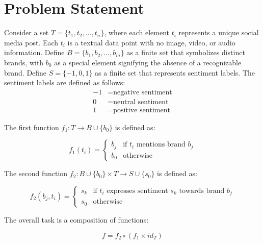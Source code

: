 \documentclass{article}
\begin{document}
\section{Problem Statement}

Consider a set $T = \{t_1, t_2, \ldots, t_n\}$, where each element $t_i$
represents a unique social media post. Each $t_i$ is a textual data point with
no image, video, or audio information. Define $B = \{b_1, b_2, \ldots, b_m\}$
as a finite set that symbolizes distinct brands, with $b_0$ as a special
element signifying the absence of a recognizable brand. Define $S = \{-1, 0,
    1\}$ as a finite set that represents sentiment labels. The sentiment labels are
defined as follows:
\begin{align*}
    -1 & = \text{negative sentiment} \\
    0  & = \text{neutral sentiment}  \\
    1  & = \text{positive sentiment}
\end{align*}

The first function $f_1: T \rightarrow B \cup \{b_0\}$ is defined as:

\[
    f_1(t_i) =
    \begin{cases}
        b_j & \text{if } t_i \text{ mentions brand } b_j \\
        b_0 & \text{otherwise}
    \end{cases}
\]

The second function $f_2: B \cup \{b_0\} \times T \rightarrow S \cup \{s_0\}$
is defined as:

\[
    f_2(b_j, t_i) =
    \begin{cases}
        s_k & \text{if } t_i \text{ expresses sentiment } s_k \text{ towards
        brand } b_j                                                          \\
        s_0 & \text{otherwise}
    \end{cases}
\]

The overall task is a composition of functions:

\[
    f = f_2 \circ (f_1 \times id_T)
\]
\end{document}
